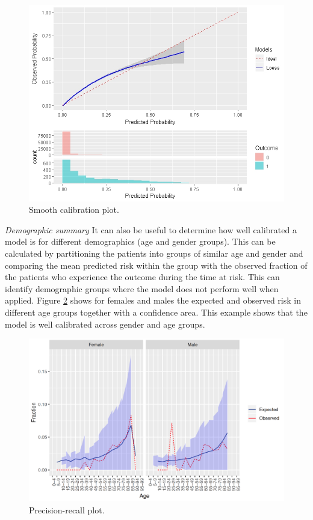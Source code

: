 \documentclass[11pt]{book}
\begin{document}
\begin{figure}

{\centering \includegraphics[width=1\linewidth]{images/PatientLevelPrediction/smoothCalibration} 

}

\caption{Smooth calibration plot.}\label{fig:plpSmoothCal}
\end{figure}

\emph{Demographic summary} It can also be useful to determine how well
calibrated a model is for different demographics (age and gender
groups). This can be calculated by partitioning the patients into groups
of similar age and gender and comparing the mean predicted risk within
the group with the observed fraction of the patients who experience the
outcome during the time at risk. This can identify demographic groups
where the model does not perform well when applied. Figure
\ref{fig:plpDemoSummary} shows for females and males the expected and
observed risk in different age groups together with a confidence area.
This example shows that the model is well calibrated across gender and
age groups.

\begin{figure}

{\centering \includegraphics[width=1\linewidth]{images/PatientLevelPrediction/demographicSummary} 

}

\caption{Precision-recall plot.}\label{fig:plpDemoSummary}
\end{figure}
\end{document}
